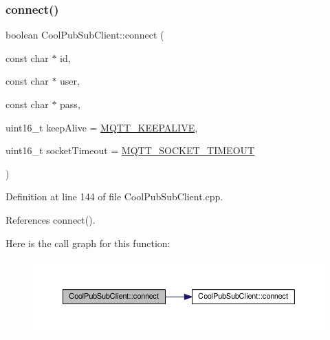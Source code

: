 \subsubsection{\texorpdfstring{connect()}{connect()}\hspace{0.1cm}{\footnotesize\ttfamily [2/4]}}
{\footnotesize\ttfamily boolean Cool\+Pub\+Sub\+Client\+::connect (\begin{DoxyParamCaption}\item[{const char $\ast$}]{id,  }\item[{const char $\ast$}]{user,  }\item[{const char $\ast$}]{pass,  }\item[{uint16\+\_\+t}]{keep\+Alive = {\ttfamily \hyperlink{_cool_pub_sub_client_8h_afb4dd8c75385ab30e659314df7c2c335}{M\+Q\+T\+T\+\_\+\+K\+E\+E\+P\+A\+L\+I\+VE}},  }\item[{uint16\+\_\+t}]{socket\+Timeout = {\ttfamily \hyperlink{_cool_pub_sub_client_8h_a092cc564e4d7f03fdab6137e30a7f05b}{M\+Q\+T\+T\+\_\+\+S\+O\+C\+K\+E\+T\+\_\+\+T\+I\+M\+E\+O\+UT}} }\end{DoxyParamCaption})}



Definition at line 144 of file Cool\+Pub\+Sub\+Client.\+cpp.



References connect().

Here is the call graph for this function\+:
\nopagebreak
\begin{figure}[H]
\begin{center}
\leavevmode
\includegraphics[width=350pt]{d8/d4b/class_cool_pub_sub_client_a7f30e39bf4ca5ea5fb9747c403639a03_cgraph}
\end{center}
\end{figure}
\mbox{\label{class_cool_pub_sub_client_af461a5a08fda1c3237e706965704ddb6}} 
